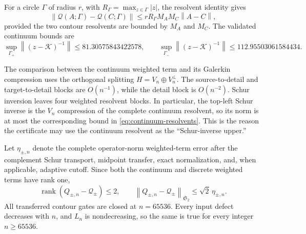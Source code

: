 \documentclass[11pt]{article}
\theoremstyle{definition}
\theoremstyle{remark}
\newcommand{\cK}{\mathcal K}
\newcommand{\cQ}{\mathcal Q}
\newcommand{\norm}[1]{\left\lVert #1\right\rVert}
\newcommand{\rank}{\operatorname{rank}}
\begin{document}
For a circle $\Gamma$ of radius $r$, with
$R_\Gamma=\max_{z\in\Gamma}|z|$, the resolvent identity gives
\begin{equation}
 \norm{\cQ(A;\Gamma)-\cQ(C;\Gamma)}
 \le rR_\Gamma M_A M_C\norm{A-C},
 \label{eq:weighted-lipschitz}
\end{equation}
provided the two contour resolvents are bounded by $M_A$ and $M_C$.
The validated continuum bounds are
\begin{equation}
 \sup_{\Gamma_+}\norm{(z-\cK)^{-1}}
 \le81.30575843422578,
 \qquad
 \sup_{\Gamma_-}\norm{(z-\cK)^{-1}}
 \le112.95503061584434.
 \label{eq:continuum-resolvents}
\end{equation}

The comparison between the continuum weighted term and its Galerkin
compression uses the orthogonal splitting $H=V_n\oplus V_n^\perp$.  The
source-to-detail and target-to-detail blocks are $O(n^{-1})$, while the
detail block is $O(n^{-2})$.  Schur inversion leaves four weighted
resolvent blocks.  In particular, the top-left Schur inverse is the
$V_n$ compression of the complete continuum resolvent, so its norm is at
most the corresponding bound in \eqref{eq:continuum-resolvents}.  This is
the reason the certificate may use the continuum resolvent as the
``Schur-inverse upper.''

Let $\eta_{\pm,n}$ denote the complete operator-norm weighted-term error
after the complement Schur transport, midpoint transfer, exact
normalization, and, when applicable, adaptive cutoff.  Since both the
continuum and discrete weighted terms have rank one,
\begin{equation}
 \rank(Q_{\pm,n}-\cQ_\pm)\le2,
 \qquad
 \norm{Q_{\pm,n}-\cQ_\pm}_{\mathfrak S_2}
 \le\sqrt2\,\eta_{\pm,n}.
 \label{eq:rank-two-hs-conversion}
\end{equation}
All transferred contour gates are closed at $n=65536$.  Every input defect
decreases with $n$, and $L_n$ is nondecreasing, so the same is true for
every integer $n\ge65536$.
\end{document}
